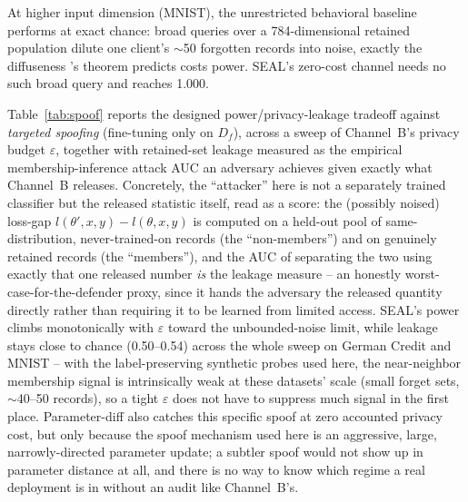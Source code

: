 \documentclass[10pt,journal,compsoc]{IEEEtran}
\begin{document}
At higher input dimension (MNIST), the unrestricted behavioral baseline performs at exact chance: broad queries over a 784-dimensional retained population dilute one client's $\sim$50 forgotten records into noise, exactly the diffuseness \cite{tang2026geometric}'s theorem predicts costs power. SEAL's zero-cost channel needs no such broad query and reaches 1.000.

Table~\ref{tab:spoof} reports the designed power/privacy-leakage tradeoff against \emph{targeted spoofing} (fine-tuning only on $D_f$), across a sweep of Channel~B's privacy budget $\varepsilon$, together with retained-set leakage measured as the empirical membership-inference attack AUC an adversary achieves given exactly what Channel~B releases. Concretely, the ``attacker'' here is not a separately trained classifier but the released statistic itself, read as a score: the (possibly noised) loss-gap $l(\theta',x,y)-l(\theta,x,y)$ is computed on a held-out pool of same-distribution, never-trained-on records (the ``non-members'') and on genuinely retained records (the ``members''), and the AUC of separating the two using exactly that one released number \emph{is} the leakage measure -- an honestly worst-case-for-the-defender proxy, since it hands the adversary the released quantity directly rather than requiring it to be learned from limited access. SEAL's power climbs monotonically with $\varepsilon$ toward the unbounded-noise limit, while leakage stays close to chance (0.50--0.54) across the whole sweep on German Credit and MNIST -- with the label-preserving synthetic probes used here, the near-neighbor membership signal is intrinsically weak at these datasets' scale (small forget sets, $\sim$40--50 records), so a tight $\varepsilon$ does not have to suppress much signal in the first place. Parameter-diff also catches this specific spoof at zero accounted privacy cost, but only because the spoof mechanism used here is an aggressive, large, narrowly-directed parameter update; a subtler spoof would not show up in parameter distance at all, and there is no way to know which regime a real deployment is in without an audit like Channel~B's.
\end{document}

